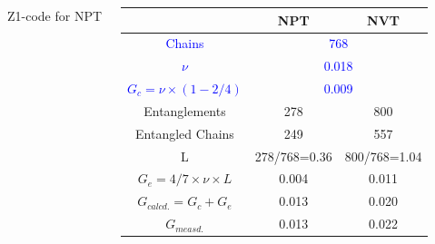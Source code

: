 \documentclass[12pt, dvipdfmx]{beamer}
\begin{document}
\begin{frame}
\begin{columns}[c, onlytextwidth]
\begin{center}
					\scriptsize
					Z1-code for NPT
				\end{center}
				\scriptsize
				\begin{center}
					\begin{tabular}{c|c|c} \hline
						&NPT & NVT \\ \hline \hline
						\textcolor{blue}{Chains} & \multicolumn{2}{|c}{\textcolor{blue}{768}}\\ \hline
						\textcolor{blue}{$\nu$}& \multicolumn{2}{|c}{\textcolor{blue}{0.018}}\\ \hline
						\textcolor{blue}{$G_c = \nu \times (1-2/4)$}&\multicolumn{2}{|c}{\textcolor{blue}{0.009}} \\ \hline \hline
						Entanglements& 278& 800\\ \hline
						Entangled Chains&249&557 \\ \hline
						L & 278/768=0.36 & 800/768=1.04 \\ \hline
						$G_e=4/7 \times \nu \times L $ & 0.004 & 0.011 \\ \hline \hline
						$G_{calcd.}=G_c + G_e$ & 0.013 & 0.020 \\ \hline \hline
						$G_{measd.}$ & 0.013 & 0.022 \\ \hline
					\end{tabular}
				\end{center}
		\end{columns}
\end{frame}
\end{document}
